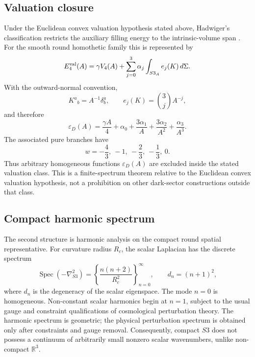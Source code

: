 \documentclass[11pt,a4paper]{article}
\def\Sthree{S3}%
\def\dd{d}%
\numberwithin{equation}{section}
\theoremstyle{remark}
\newcommand{\Sthree}{S^3}
\newcommand{\Efour}{E_4}
\newcommand{\epsD}{\varepsilon_D}
\newcommand{\dd}{\mathrm{d}}
\begin{document}
\subsection{Valuation closure}
Under the Euclidean convex valuation hypothesis stated above, Hadwiger's classification restricts the auxiliary filling energy to the intrinsic-volume span \cite{Hadwiger1957,Schneider2014}. For the smooth round homothetic family this is represented by
\begin{equation}
\Efour^{\rm val}(A)
=\gamma V_4(A)
+\sum_{j=0}^{3}\alpha_j
\int_{\Sthree_A}e_j(K)\,\dd\Sigma .
\end{equation}
With the outward-normal convention,
\begin{equation}
K^a{}_b=A^{-1}\delta^a_b,
\qquad
e_j(K)=\binom{3}{j}A^{-j},
\end{equation}
and therefore
\begin{equation}
\epsD(A)
=\frac{\gamma A}{4}
+\alpha_0
+\frac{3\alpha_1}{A}
+\frac{3\alpha_2}{A^2}
+\frac{\alpha_3}{A^3}.
\end{equation}
The associated pure branches have
\begin{equation}
w=-\frac{4}{3},\ -1,\ -\frac{2}{3},\ -\frac{1}{3},\ 0.
\end{equation}
Thus arbitrary homogeneous functions \(\epsD(A)\) are excluded inside the stated valuation class. This is a finite-spectrum theorem relative to the Euclidean convex valuation hypothesis, not a prohibition on other dark-sector constructions outside that class.

\subsection{Compact harmonic spectrum}
The second structure is harmonic analysis on the compact round spatial representative. For curvature radius \(R_c\), the scalar Laplacian has the discrete spectrum \cite{HalliwellHawking1985,KodamaSasaki1984}
\begin{equation}
\operatorname{Spec}(-\nabla^2_{\Sthree})
=
\left\{
\frac{n(n+2)}{R_c^2}
\right\}_{n=0}^{\infty},
\qquad
d_n=(n+1)^2,
\end{equation}
where \(d_n\) is the degeneracy of the scalar eigenspace. The mode \(n=0\) is homogeneous. Non-constant scalar harmonics begin at \(n=1\), subject to the usual gauge and constraint qualifications of cosmological perturbation theory. The harmonic spectrum is geometric; the physical perturbation spectrum is obtained only after constraints and gauge removal. Consequently, compact \(\Sthree\) does not possess a continuum of arbitrarily small nonzero scalar wavenumbers, unlike non-compact \(\mathbb{R}^3\).
\end{document}
